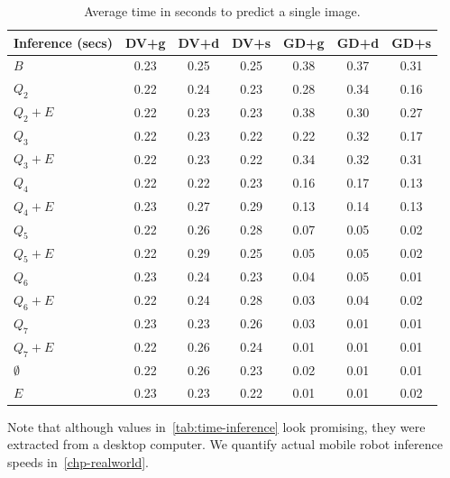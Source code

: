 \begin{table}[h]
  \centering
  \begin{tabular}{l|c|c|c|c|c|c}
    \hline
    \multicolumn{1}{c}{\bfseries Inference (secs)} & \multicolumn{1}{c}{\bfseries DV+g} &
    \multicolumn{1}{c}{\bfseries DV+d} & \multicolumn{1}{c}{\bfseries DV+s} &
    \multicolumn{1}{c}{\bfseries GD+g} & \multicolumn{1}{c}{\bfseries GD+d} &
    \multicolumn{1}{c}{\bfseries GD+s}\\
    \hline
    $B$         & 0.23 & 0.25 & 0.25 & 0.38 & 0.37 & 0.31 \\
    $Q_2$       & 0.22 & 0.24 & 0.23 & 0.28 & 0.34 & 0.16 \\
    $Q_2+E$     & 0.22 & 0.23 & 0.23 & 0.38 & 0.30 & 0.27 \\
    $Q_3$       & 0.22 & 0.23 & 0.22 & 0.22 & 0.32 & 0.17 \\
    $Q_3+E$     & 0.22 & 0.23 & 0.22 & 0.34 & 0.32 & 0.31 \\
    $Q_4$       & 0.22 & 0.22 & 0.23 & 0.16 & 0.17 & 0.13 \\
    $Q_4+E$     & 0.23 & 0.27 & 0.29 & 0.13 & 0.14 & 0.13 \\
    $Q_5$       & 0.22 & 0.26 & 0.28 & 0.07 & 0.05 & 0.02 \\
    $Q_5+E$     & 0.22 & 0.29 & 0.25 & 0.05 & 0.05 & 0.02 \\
    $Q_6$       & 0.23 & 0.24 & 0.23 & 0.04 & 0.05 & 0.01 \\
    $Q_6+E$     & 0.22 & 0.24 & 0.28 & 0.03 & 0.04 & 0.02 \\
    $Q_7$       & 0.23 & 0.23 & 0.26 & 0.03 & 0.01 & 0.01 \\
    $Q_7+E$     & 0.22 & 0.26 & 0.24 & 0.01 & 0.01 & 0.01 \\
    $\emptyset$ & 0.22 & 0.26 & 0.23 & 0.02 & 0.01 & 0.01 \\
    $E$         & 0.23 & 0.23 & 0.22 & 0.01 & 0.01 & 0.02 \\
  \end{tabular}
  \caption{Average time in seconds to predict a single image.\label{tab:time-inference}}
\end{table}

Note that although values in~\autoref{tab:time-inference} look promising, they were extracted from
a desktop computer. We quantify actual mobile robot inference speeds in~\autoref{chp-realworld}.
